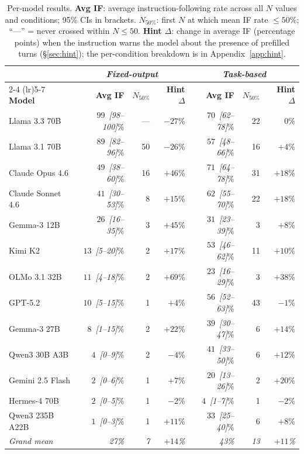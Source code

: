 \begin{table}[t]
\centering
\small
\setlength{\tabcolsep}{4pt}
\renewcommand{\arraystretch}{0.92}
\begin{tabular}{l rrr rrr}
\toprule
 & \multicolumn{3}{c}{\emph{Fixed-output}} & \multicolumn{3}{c}{\emph{Task-based}} \\
\cmidrule(lr){2-4} \cmidrule(lr){5-7}
\textbf{Model}
  & \textbf{Avg IF} & \textbf{$N_{50\%}$} & \textbf{Hint $\Delta$}
  & \textbf{Avg IF} & \textbf{$N_{50\%}$} & \textbf{Hint $\Delta$} \\
\midrule
Llama 3.3 70B     & $99$~\textit{[98--100]}\% & ---  & $-27$\% & $70$~\textit{[62--78]}\% & 22 & $0$\%   \\
Llama 3.1 70B     & $89$~\textit{[82--96]}\%  & 50   & $-26$\% & $57$~\textit{[48--66]}\% & 16 & $+4$\%  \\
Claude Opus 4.6   & $49$~\textit{[38--60]}\%  & 16   & $+46$\% & $71$~\textit{[64--78]}\% & 31 & $+18$\% \\
Claude Sonnet 4.6 & $41$~\textit{[30--53]}\%  & 8    & $+15$\% & $62$~\textit{[55--70]}\% & 22 & $+18$\% \\
Gemma-3 12B       & $26$~\textit{[16--35]}\%  & 3    & $+45$\% & $31$~\textit{[23--39]}\% & 3  & $+8$\%  \\
Kimi K2           & $13$~\textit{[5--20]}\%   & 2    & $+17$\% & $53$~\textit{[46--62]}\% & 11 & $+10$\% \\
OLMo 3.1 32B      & $11$~\textit{[4--18]}\%   & 2    & $+69$\% & $23$~\textit{[16--29]}\% & 3  & $+38$\% \\
GPT-5.2           & $10$~\textit{[5--15]}\%   & 1    & $+4$\%  & $56$~\textit{[52--63]}\% & 43 & $-1$\%  \\
Gemma-3 27B       & $8$~\textit{[1--15]}\%    & 2    & $+22$\% & $39$~\textit{[30--47]}\% & 6  & $+14$\% \\
Qwen3 30B A3B     & $4$~\textit{[0--9]}\%     & 2    & $-4$\%  & $41$~\textit{[33--50]}\% & 6  & $+12$\% \\
Gemini 2.5 Flash  & $2$~\textit{[0--6]}\%     & 1    & $+7$\%  & $20$~\textit{[13--26]}\% & 2  & $+20$\% \\
Hermes-4 70B      & $2$~\textit{[0--5]}\%     & 1    & $-2$\%  & $4$~\textit{[1--7]}\%    & 1  & $-2$\%  \\
Qwen3 235B A22B   & $1$~\textit{[0--3]}\%     & 1    & $+11$\% & $33$~\textit{[25--40]}\% & 6  & $+8$\%  \\
\midrule
\textit{Grand mean} & \textit{27\%} & \textit{7} & \textit{$+14$\%} & \textit{43\%} & \textit{13} & \textit{$+11$\%} \\
\bottomrule
\end{tabular}
\caption{Per-model results. \textbf{Avg IF}: average instruction-following rate across all $N$ values and conditions; 95\% CIs in brackets. \textbf{$N_{50\%}$}: first $N$ at which mean IF rate $\leq 50\%$; ``---'' = never crossed within $N \leq 50$. \textbf{Hint $\Delta$}: change in average IF (percentage points) when the instruction warns the model about the presence of prefilled turns (\S\ref{sec:hint}); the per-condition breakdown is in Appendix~\ref{app:hint}.}
\label{tab:results}
\end{table}

